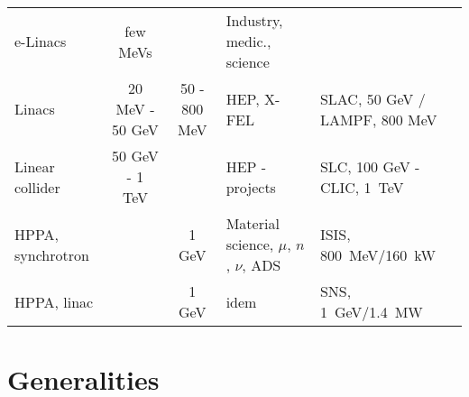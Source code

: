 \documentclass[12pt]{article}
\begin{document}
\begin{table}[t]
\begin{center}
\begin{tabular}{|l|c||c|l|l|}
e-Linacs                        &  few MeVs             &                 &  Industry, medic., science    & \\[.6ex]
Linacs                          &   20 MeV - 50 GeV  & 50 - 800 MeV    &  HEP, X-FEL             & SLAC, 50 GeV / LAMPF, 800 MeV  \\[.6ex]
Linear collider                 &  50 GeV - 1 TeV    &                 & HEP - projects          & SLC, 100 GeV - CLIC, 1~TeV \\[.6ex]
HPPA, synchrotron      &                    &         1 GeV   & Material science, $\mu$, $n$, $\nu$,  ADS   & ISIS, 800~MeV/160~kW     \\[.6ex]
HPPA, linac            &                    &    1 GeV        & idem   & SNS, 1~GeV/1.4~MW     \\[.6ex]
\hline
\end{tabular}
\end{center}

\end{table}





\clearpage

\section*{\LARGE Generalities }
\end{document}

